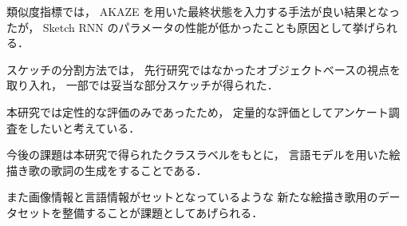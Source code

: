 \documentclass[twocolumn]{jarticle}     %
\begin{document}
類似度指標では，
AKAZE を用いた最終状態を入力する手法が良い結果となったが，
Sketch RNN のパラメータの性能が低かったことも原因として挙げられる．

スケッチの分割方法では，
先行研究ではなかったオブジェクトベースの視点を取り入れ，
一部では妥当な部分スケッチが得られた．

本研究では定性的な評価のみであったため，
定量的な評価としてアンケート調査をしたいと考えている．


今後の課題は本研究で得られたクラスラベルをもとに，
言語モデルを用いた絵描き歌の歌詞の生成をすることである．

また画像情報と言語情報がセットとなっているような
新たな絵描き歌用のデータセットを整備することが課題としてあげられる．

%
%
%



\end{document}
